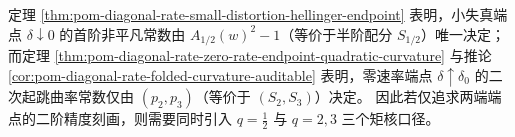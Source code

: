 
\begin{remark}[端点二阶审计的矩核族]\label{rem:pom-diagonal-rate-endpoint-three-kernel-principle}
定理 \ref{thm:pom-diagonal-rate-small-distortion-hellinger-endpoint} 表明，小失真端点 \(\delta\downarrow 0\) 的首阶非平凡常数由 \(A_{1/2}(w)^2-1\)（等价于半阶配分 \(S_{1/2}\)）唯一决定；
而定理 \ref{thm:pom-diagonal-rate-zero-rate-endpoint-quadratic-curvature} 与推论 \ref{cor:pom-diagonal-rate-folded-curvature-auditable} 表明，零速率端点 \(\delta\uparrow\delta_0\) 的二次起跳曲率常数仅由 \((p_2,p_3)\)（等价于 \((S_2,S_3)\)）决定。
因此若仅追求两端端点的二阶精度刻画，则需要同时引入 \(q=\tfrac12\) 与 \(q=2,3\) 三个矩核口径。
\end{remark}

